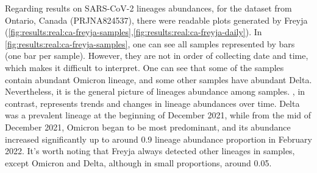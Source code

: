 \begin{figure}[H]
\begin{subfigure}[b]{0.44\textwidth}
        \label{fig:results:real:krona-ca-c}
        \end{subfigure}
    \end{figure}
    
    Regarding results on SARS-CoV-2 lineages abundances, for the dataset from Ontario, Canada (PRJNA824537), there were readable plots generated by Freyja (\cref{fig:results:real:ca-freyja-samples},\ref{fig:results:real:ca-freyja-daily}). In \cref{fig:results:real:ca-freyja-samples}, one can see all samples represented by bars (one bar per sample). However, they are not in order of collecting date and time, which makes it difficult to interpret. One can see that some of the samples contain abundant Omicron lineage, and some other samples have abundant Delta. Nevertheless, it is the general picture of lineages abundance among samples. , in contrast, represents trends and changes in lineage abundances over time. Delta was a prevalent lineage at the beginning of December 2021, while from the mid of December 2021, Omicron began to be most predominant, and its abundance increased significantly up to around 0.9 lineage abundance proportion in February 2022. It's worth noting that Freyja always detected other lineages in samples, except Omicron and Delta, although in small proportions, around 0.05.
    
